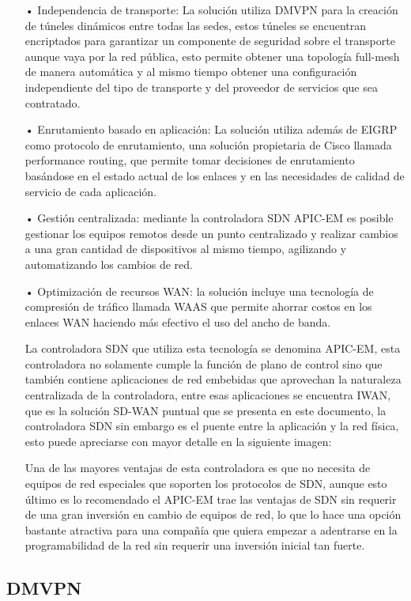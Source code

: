 \begin{itemize}
\item[•]Independencia de transporte: La solución utiliza DMVPN para la creación de túneles dinámicos entre todas las sedes, estos túneles se encuentran encriptados para garantizar un componente de seguridad sobre el transporte aunque vaya por la red pública, esto permite obtener una topología full-mesh de manera automática y al mismo tiempo obtener una configuración independiente del tipo de transporte y del proveedor de servicios que sea contratado.
\item[•]Enrutamiento basado en aplicación: La solución utiliza además de EIGRP como protocolo de enrutamiento, una solución propietaria de Cisco llamada performance routing, que permite tomar decisiones de enrutamiento basándose en el estado actual de los enlaces y en las necesidades de calidad de servicio de cada aplicación.
\item[•]Gestión centralizada: mediante la controladora SDN APIC-EM es posible gestionar los equipos remotos desde un punto centralizado y realizar cambios a una gran cantidad de dispositivos al mismo tiempo, agilizando y automatizando los cambios de red.
\item[•]Optimización de recursos WAN: la solución incluye una tecnología de compresión de tráfico llamada WAAS que permite ahorrar costos en los enlaces WAN haciendo más efectivo el uso del ancho de banda.

La controladora SDN que utiliza esta tecnología se denomina APIC-EM, esta controladora no solamente cumple la función de plano de control sino que también contiene aplicaciones de red embebidas que aprovechan la naturaleza centralizada de la controladora, entre esas aplicaciones se encuentra IWAN, que es la solución SD-WAN puntual que se presenta en este documento, la controladora SDN sin embargo es el puente entre la aplicación y la red física, esto puede apreciarse con mayor detalle en la siguiente imagen:


Una de las mayores ventajas de esta controladora es que no necesita de equipos de red especiales que soporten los protocolos de SDN, aunque esto último es lo recomendado el APIC-EM trae las ventajas de SDN sin requerir de una gran inversión en cambio de equipos de red, lo que lo hace una opción bastante atractiva para una compañía que quiera empezar a adentrarse en la programabilidad de la red sin requerir una inversión inicial tan fuerte.
\end{itemize}

\subsection{DMVPN}
\label{sec:DMVPN}

